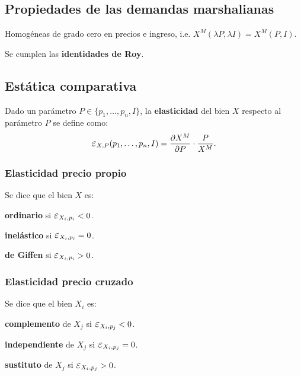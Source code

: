 \documentclass[8pt,a4paper]{extarticle}
\begin{document}
\begin{multicols}{3}
\subsection{Propiedades de las demandas marshalianas}

\begin{eqlist}
\item Homogéneas de grado cero en precios e ingreso, i.e. $X^M (\lambda P, \lambda I) = X^M(P, I)$.
\item Se cumplen las \textbf{identidades de Roy}.
\end{eqlist}

\subsection{Estática comparativa}

\begin{boxdef}[Elasticidad]
	Dado un parámetro $P \in \{ p_1,\ldots, p_n, I \}$, la \textbf{elasticidad} del bien $X$ respecto al parámetro $P$ se define como:
	\[
		\E_{X, P} (p_1,\ldots, p_n, I) = \frac{\partial X^M}{\partial P} \cdot \frac{P}{X^M}
	.\] 
\end{boxdef}

\subsubsection*{Elasticidad precio propio}

Se dice que el bien $X$ es:

\begin{eqlist}
\item \textbf{ordinario} si $ \E_{X_i, p_i} < 0$.
\item \textbf{inelástico} si $\E_{X_i, p_i} = 0$.
\item \textbf{de Giffen} si $\E_{X_i, p_i} > 0$.
\end{eqlist}

\subsubsection*{Elasticidad precio cruzado}

Se dice que el bien $X_i$ es:

\begin{eqlist}
\item \textbf{complemento} de $X_j$ si $\E_{X_i, p_j} < 0$.
\item \textbf{independiente} de $X_j$ si $\E_{X_i, p_j} = 0$.
\item \textbf{sustituto} de $X_j$ si $\E_{X_i, p_j} > 0$.
\end{eqlist}


\end{multicols}
\end{document}

